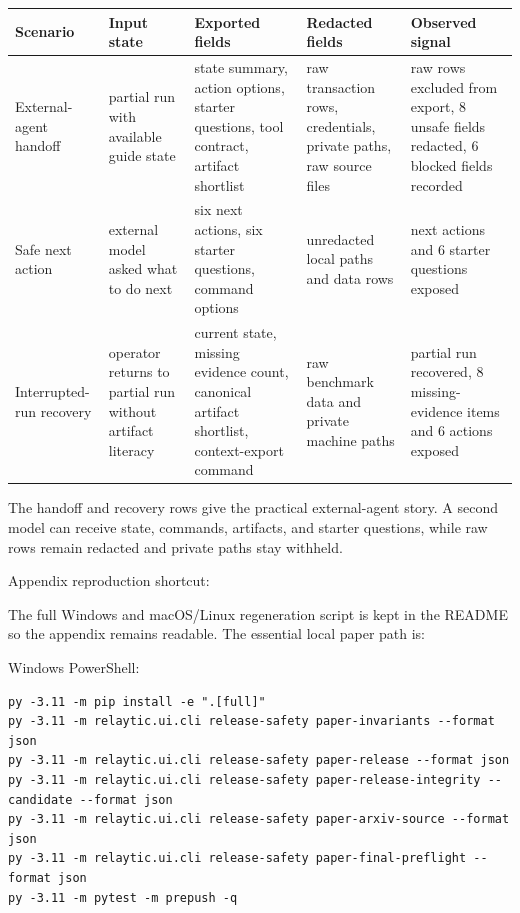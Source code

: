 \documentclass[11pt]{article}
\begin{document}
\begin{center}
\begin{minipage}{\linewidth}
\scriptsize
\setlength{\tabcolsep}{3pt}
\renewcommand{\arraystretch}{1.16}
\begin{tabularx}{\linewidth}{@{}>{\raggedright\arraybackslash}X >{\raggedright\arraybackslash}X >{\raggedright\arraybackslash}X >{\raggedright\arraybackslash}X >{\raggedright\arraybackslash}X@{}}
\toprule
Scenario & Input state & Exported fields & Redacted fields & Observed signal \\
\midrule
External-agent handoff & partial run with available guide state & state summary, action options, starter questions, tool contract, artifact shortlist & raw transaction rows, credentials, private paths, raw source files & raw rows excluded from export, 8 unsafe fields redacted, 6 blocked fields recorded \\
Safe next action & external model asked what to do next & six next actions, six starter questions, command options & unredacted local paths and data rows & 6 next actions and 6 starter questions exposed \\
Interrupted-run recovery & operator returns to partial run without artifact literacy & current state, missing evidence count, canonical artifact shortlist, context-export command & raw benchmark data and private machine paths & partial run recovered, 8 missing-evidence items and 6 actions exposed \\
\bottomrule
\end{tabularx}
\end{minipage}
\end{center}


The handoff and recovery rows give the practical external-agent story. A second model can receive state, commands, artifacts, and starter questions, while raw rows remain redacted and private paths stay withheld.

Appendix reproduction shortcut:

The full Windows and macOS/Linux regeneration script is kept in the README so the appendix remains readable. The essential local paper path is:

Windows PowerShell:

\begin{Verbatim}[frame=single,framesep=6pt,fontsize=\footnotesize,breaklines=true,breakanywhere=true]
py -3.11 -m pip install -e ".[full]"
py -3.11 -m relaytic.ui.cli release-safety paper-invariants --format json
py -3.11 -m relaytic.ui.cli release-safety paper-release --format json
py -3.11 -m relaytic.ui.cli release-safety paper-release-integrity --candidate --format json
py -3.11 -m relaytic.ui.cli release-safety paper-arxiv-source --format json
py -3.11 -m relaytic.ui.cli release-safety paper-final-preflight --format json
py -3.11 -m pytest -m prepush -q
\end{Verbatim}
\end{document}
